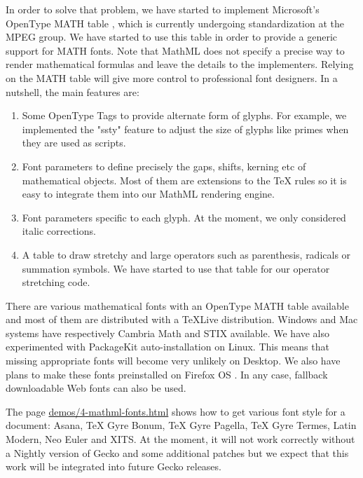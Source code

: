 In order to solve that problem, we have started to implement Microsoft's
OpenType MATH table \cite{OpenTypeMATHtable}, which is currently undergoing
standardization at the MPEG group.
We have started to use this table in order to provide a generic
support for MATH fonts. 
Note that MathML does not specify a precise way to render mathematical formulas
and leave the details to the implementers. Relying on the MATH table will give
more control to professional font designers.
In a nutshell, the main features are:

\begin{enumerate}

\item Some OpenType Tags to provide alternate form of glyphs. For example,
  we implemented the "ssty" feature to adjust the size of glyphs like primes
  when they are used as scripts.

\item Font parameters to define precisely the gaps, shifts, kerning etc of
  mathematical objects. Most of them are extensions to the TeX rules so it
  is easy to integrate them into our MathML rendering engine.

\item Font parameters specific to each glyph. At the moment, we only considered
  italic corrections.

\item A table to draw stretchy and large operators such as parenthesis,
  radicals or summation symbols. We have started to use that table for our
  operator stretching code.

\end{enumerate}

There are various mathematical fonts with an OpenType MATH table available and
most of them are distributed with a TeXLive distribution. Windows and Mac
systems have respectively Cambria Math and STIX available. We have also
experimented with PackageKit auto-installation on Linux. This means that
missing appropriate fonts will become very unlikely on Desktop. We also have
plans to make these fonts preinstalled on Firefox OS
\cite{BugzillaFirefoxOSFonts}. In any case, fallback
downloadable Web fonts can also be used.

The page \href{http://fred-wang.github.io/MathUI2014/demos/4-mathml-fonts.html}{demos/4-mathml-fonts.html} shows how to get various font style for
a document: Asana, TeX Gyre Bonum, TeX Gyre Pagella, TeX Gyre Termes,
Latin Modern, Neo Euler and XITS. At the moment, it will not work correctly
without a Nightly version of Gecko and some additional patches but we expect
that this work will be integrated into future Gecko releases.

